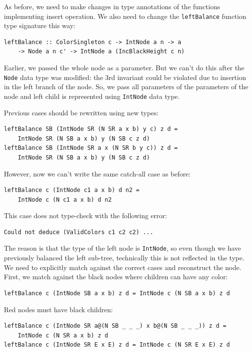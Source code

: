 \documentclass{tmr}
\begin{document}
As before, we need to make changes in type annotations of the functions implementing insert operation. We also need to change the \verb|leftBalance| function type signature this way:

\begin{Verbatim}
leftBalance :: ColorSingleton c -> IntNode a n -> a
    -> Node a n c' -> IntNode a (IncBlackHeight c n)
\end{Verbatim}

Earlier, we passed the whole node as a parameter. But we can't do this after the \verb|Node| data type was modified: the 3rd invariant could be violated due to insertion in the left branch of the node. So, we pass all parameters of the parameters of the node and left child is represented using \verb|IntNode| data type.

Previous cases should be rewritten using new types:

\begin{Verbatim}
leftBalance SB (IntNode SR (N SR a x b) y c) z d =
    IntNode SR (N SB a x b) y (N SB c z d)
leftBalance SB (IntNode SR a x (N SR b y c)) z d =
    IntNode SR (N SB a x b) y (N SB c z d)
\end{Verbatim}

However, now we can't write the same catch-all case as before:

\begin{Verbatim}
leftBalance c (IntNode c1 a x b) d n2 =
    IntNode c (N c1 a x b) d n2
\end{Verbatim}

This case does not type-check with the following error:

\begin{Verbatim}
Could not deduce (ValidColors c1 c2 c2) ...
\end{Verbatim}

The reason is that the type of the left node is \verb|IntNode|, so even though we have previously balanced the left sub-tree, technically this is not reflected in the type. We need to explicitly match against the correct cases and reconstruct the node. First, we match against the black nodes where children can have any color:

\begin{Verbatim}
leftBalance c (IntNode SB a x b) z d = IntNode c (N SB a x b) z d
\end{Verbatim}

Red nodes must have black children:

\begin{Verbatim}
leftBalance c (IntNode SR a@(N SB _ _ _) x b@(N SB _ _ _)) z d =
    IntNode c (N SR a x b) z d
leftBalance c (IntNode SR E x E) z d = IntNode c (N SR E x E) z d
\end{Verbatim}
\end{document}
